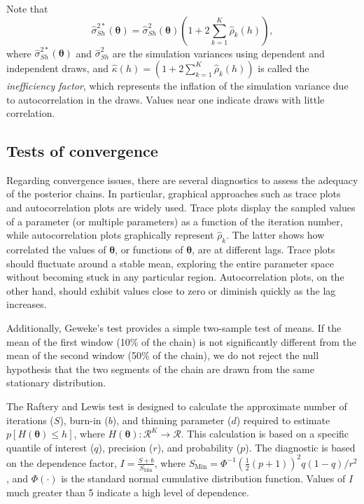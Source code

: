 Note that  
\[  
\hat{\sigma}^{2*}_{Sh}(\bm{\theta}) = \hat{\sigma}^2_{Sh}\left(\bm{\theta}\right) (1+2\sum_{k=1}^K \hat{\rho}_k(h)),  
\]  
where $\hat{\sigma}^{2*}_{Sh}(\bm{\theta})$ and $\hat{\sigma}^2_{Sh}$ are the simulation variances using dependent and independent draws, and $\hat{\kappa}(h) = (1+2\sum_{k=1}^K \hat{\rho}_k(h))$ is called the \textit{inefficiency factor}, which represents the inflation of the simulation variance due to autocorrelation in the draws. Values near one indicate draws with little correlation.  

 
\subsection{Tests of convergence}

Regarding convergence issues, there are several diagnostics to assess the adequacy of the posterior chains. In particular, graphical approaches such as trace plots and autocorrelation plots are widely used. Trace plots display the sampled values of a parameter (or multiple parameters) as a function of the iteration number, while autocorrelation plots graphically represent $\hat{\rho}_k$. The latter shows how correlated the values of $\bm{\theta}$, or functions of $\bm{\theta}$, are at different lags. Trace plots should fluctuate around a stable mean, exploring the entire parameter space without becoming stuck in any particular region. Autocorrelation plots, on the other hand, should exhibit values close to zero or diminish quickly as the lag increases.

Additionally, Geweke's test \cite{Geweke1992} provides a simple two-sample test of means. If the mean of the first window (10\% of the chain) is not significantly different from the mean of the second window (50\% of the chain), we do not reject the null hypothesis that the two segments of the chain are drawn from the same stationary distribution.

The Raftery and Lewis test \cite{Raftery1992} is designed to calculate the approximate number of iterations ($S$), burn-in ($b$), and thinning parameter ($d$) required to estimate $p\left[H(\bm{\theta}) \leq h\right]$, where $H(\bm{\theta}): \mathcal{R}^K \rightarrow \mathcal{R}$. This calculation is based on a specific quantile of interest ($q$), precision ($r$), and probability ($p$). The diagnostic is based on the dependence factor, $I = \frac{S + b}{S_{\text{Min}}}$, where $S_{\text{Min}} = \Phi^{-1}\left(\frac{1}{2}(p+1)\right)^2 q(1-q) / r^2$, and $\Phi(\cdot)$ is the standard normal cumulative distribution function. Values of $I$ much greater than 5 indicate a high level of dependence.

